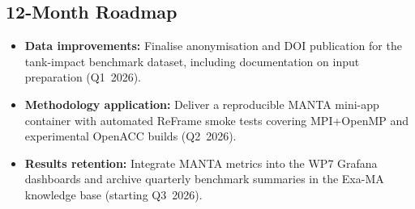 \subsection{12-Month Roadmap}
\label{sec:WP7:MANTA:roadmap}

\begin{itemize}
    \item \textbf{Data improvements:} Finalise anonymisation and DOI publication for the tank-impact benchmark dataset, including documentation on input preparation (Q1~2026).
    \item \textbf{Methodology application:} Deliver a reproducible MANTA mini-app container with automated ReFrame smoke tests covering MPI+OpenMP and experimental OpenACC builds (Q2~2026).
    \item \textbf{Results retention:} Integrate MANTA metrics into the WP7 Grafana dashboards and archive quarterly benchmark summaries in the Exa-MA knowledge base (starting Q3~2026).
\end{itemize}
